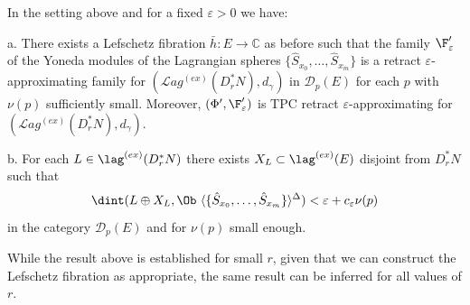 \begin{cor} \label{thm:nearby_far} 
In the setting above and for a fixed $\varepsilon>0$ we have: 

a. There exists a Lefschetz fibration $\bar{h}:E\to \mathbb{C}$ as before such that the family
$\F'_{\varepsilon}$ of the Yoneda modules of the Lagrangian spheres $\{\hat{S}_{x_{0}}, \ldots, \hat{S}_{x_{m}}\}$ is a retract $\varepsilon$-approximating family for $(\mathcal{L}ag^{(ex)}(D^{\ast}_{r}N), d_{\gamma})$ in $\mathscr{D}_{p}(E)$ for each $p$ with $\nu(p)$ sufficiently small. Moreover, $(\Phi',\F'_{\varepsilon})$ is TPC retract $\varepsilon$-approximating for  $(\mathcal{L}ag^{(ex)}(D^{\ast}_{r}N), d_{\gamma})$. 

b. For each $L\in\lag^{(ex)}(D^{\ast}_{r}N)$ there exists
$X_{L}\subset \lag^{(ex)}(E)$ disjoint from $D^{\ast}_{r}N$ such that 
$$\dint (L\oplus X_{L}, \Ob\  \langle\{\hat{S}_{x_{0}},\ldots, \hat{S}_{x_{m}}\} \rangle ^{\Delta}) <\varepsilon + c_{\varepsilon}\nu(p)$$ in the category $\mathscr{D}_{p}(E)$ and for $\nu(p)$ small enough.
\end{cor}

While the result above is established for small $r$, given that we can construct  the
Lefschetz fibration as appropriate, the same result can be inferred for all values of $r$.
 
